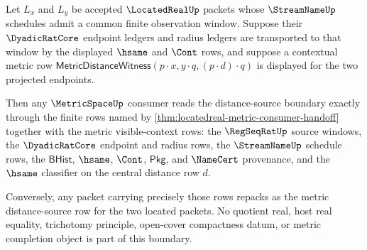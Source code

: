 \begin{theorem}
\label{thm:metricspace-locatedreal-distance-source-boundary}
Let $L_x$ and $L_y$ be accepted $\LocatedRealUp$ packets whose
$\StreamNameUp$ schedules admit a common finite observation window. Suppose
their $\DyadicRatCore$ endpoint ledgers and radius ledgers are transported to
that window by the displayed $\hsame$ and $\Cont$ rows, and suppose a
contextual metric row
$\mathsf{MetricDistanceWitness}(p\cdot x,y\cdot q,(p\cdot d)\cdot q)$
is displayed for the two projected endpoints.

Then any $\MetricSpaceUp$ consumer reads the distance-source boundary exactly
through the finite rows named by
\autoref{thm:locatedreal-metric-consumer-handoff} together with the metric
visible-context rows: the $\RegSeqRatUp$ source windows, the $\DyadicRatCore$
endpoint and radius rows, the $\StreamNameUp$ schedule rows, the
$\mathsf{BHist}$, $\hsame$, $\Cont$, $\mathsf{Pkg}$, and $\NameCert$
provenance, and the $\hsame$ classifier on the central distance row $d$.

Conversely, any packet carrying precisely those rows repacks as the metric
distance-source row for the two located packets. No quotient real, host real
equality, trichotomy principle, open-cover compactness datum, or metric
completion object is part of this boundary.
\end{theorem}
